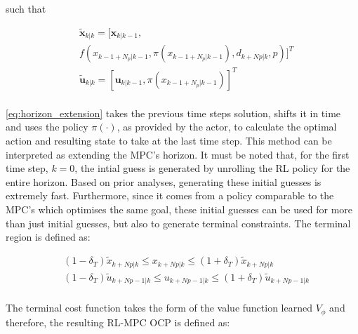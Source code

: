 such that

\begin{equation}\label{eq:horizon_extension}
	\begin{aligned}
		&\tilde{\mathbf{x}}_{k|k} = [\mathbf{x}_{k|k-1}, \\ & f(x_{k-1 + N_p|k-1}, \pi(x_{k-1 + N_p|k-1}), d_{k+Np|k},p)]^T \\ 
		&\tilde{\mathbf{u}}_{k|k} = [\mathbf{u}_{k|k-1},\pi(x_{k-1 + N_p|k-1})]^T\\
	\end{aligned}
\end{equation}

\autoref{eq:horizon_extension} takes the previous time steps solution, shifts it in time and uses the policy $\pi(\cdot)$, as provided by the actor, to calculate the optimal action and resulting state to take at the last time step. This method can be interpreted as extending the MPC's horizon. It must be noted that, for the first time step, $k=0$, the intial guess is generated by unrolling the RL policy for the entire horizon. Based on prior analyses, generating these initial guesses is extremely fast. Furthermore, since it comes from a policy comparable to the MPC’s which optimises the same goal, these initial guesses can be used for more than just initial guesses, but also to generate terminal constraints. The terminal region is defined as:

\begin{equation}\label{eq:terminal-region}
	\begin{aligned}
		& (1-\delta_T)\tilde{x}_{k+Np|k} \leq x_{k+Np|k} \leq (1+\delta_T)\tilde{x}_{k+Np|k}\\
		&(1-\delta_T)\tilde{u}_{k+Np-1|k} \leq u_{k+Np-1|k} \leq (1+\delta_T) \tilde{u}_{k+Np-1|k}\\
	\end{aligned}
\end{equation}

The terminal cost function takes the form of the value function learned $V_\phi$ and therefore, the resulting RL-MPC OCP is defined as:

